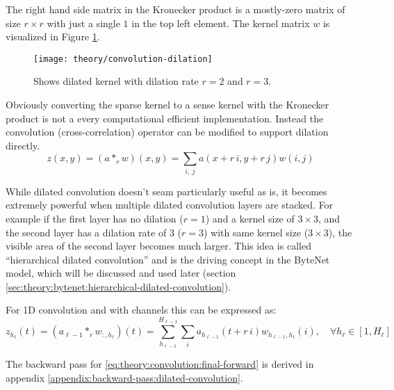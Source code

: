 The right hand side matrix in the Kronecker product is a mostly-zero matrix of size $r \times r$ with just a single $1$ in the top left element. The kernel matrix $w$ is visualized in Figure \ref{fig:convolution:dilation}.

\begin{figure}[h]
	\centering
	\texttt{[image: theory/convolution-dilation]}
	\caption{Shows dilated kernel with dilation rate $r = 2$ and $r = 3$.}
	\label{fig:convolution:dilation}
\end{figure}

Obviously converting the sparse kernel to a sense kernel with the Kronecker product is not a every computational efficient implementation. Instead the convolution (cross-correlation) operator can be modified to support dilation directly.
\begin{equation}
z(x, y) = (a *_r w)(x, y) = \sum_{i,\ j} a(x + r\, i, y + r\, j) w(i, j)
\end{equation}

While dilated convolution doesn't seam particularly useful as is, it becomes extremely powerful when multiple dilated convolution layers are stacked. For example if the first layer has no dilation ($r = 1$) and a kernel size of $3 \times 3$, and the second layer has a dilation rate of 3 ($r = 3$) with same kernel size ($3 \times 3$), the visible area of the second layer becomes much larger. This idea is called ``hierarchical dilated convolution'' and is the driving concept in the ByteNet model, which will be discussed and used later (section \ref{sec:theory:bytenet:hierarchical-dilated-convolution}).

For 1D convolution and with channels this can be expressed as:
\begin{equation}
z_{h_\ell}(t) = (a_{\ell-1} *_r w_{:, h_\ell})(t) = \sum_{h_{\ell-1}}^{H_{\ell-1}} \sum_{i} a_{h_{\ell-1}}(t + r\,i) w_{h_{\ell-1}, h_\ell}(i), \quad \forall h_\ell \in [1, H_\ell]
\label{eq:theory:convolution:final-forward}
\end{equation}

The backward pass for \eqref{eq:theory:convolution:final-forward} is derived in appendix \ref{appendix:backward-pass:dilated-convolution}.
